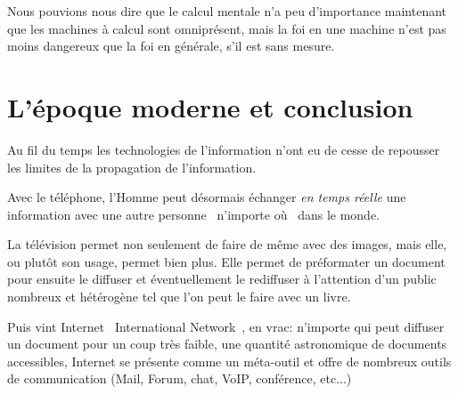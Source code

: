 Nous pouvions nous dire que le calcul mentale n'a peu d'importance maintenant que les machines à calcul sont omniprésent, mais la foi en une machine n'est pas moins dangereux que la foi en générale, s'il est sans mesure. 


\chapter{L'époque moderne et conclusion}

Au fil du temps les technologies de l'information n'ont eu de cesse de repousser les limites de
la propagation de l'information. 

Avec le téléphone, l'Homme peut désormais échanger \emph{en temps réelle} une 
information avec une autre personne \og{}~n'importe où~\fg{} dans le monde.

La télévision permet non seulement de faire de même avec des images, mais elle,
ou plutôt son usage, permet bien plus. Elle permet de préformater un document pour ensuite le
diffuser et éventuellement le rediffuser à l'attention d'un public nombreux et
hétérogène tel que l'on peut le faire avec un livre.

Puis vint Internet \og{}~International Network~\fg{}, en vrac: n'importe qui
peut diffuser un document pour un coup très faible, une quantité astronomique
de documents accessibles, Internet se présente comme un méta-outil et offre de
nombreux outils de communication (Mail, Forum, chat, VoIP, conférence, etc...)



